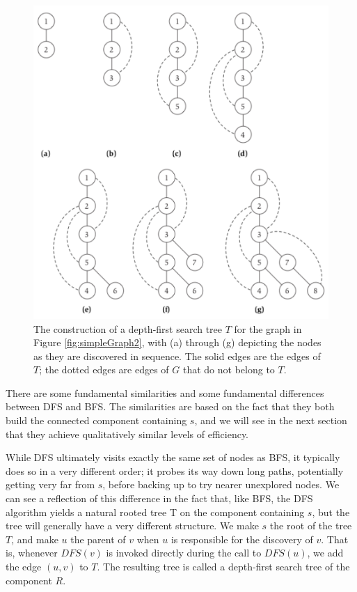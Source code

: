 \documentclass[12pt,a4paper]{book}
\begin{document}
\begin{figure}[h]
    \centering
    \label{fig:simpleGraph7}
    \includegraphics[width=\textwidth]{simpleGraph7}
    \caption{ The construction of a depth-first search tree $T$ for the graph in Figure \ref{fig:simpleGraph2}, with (a) through (g) depicting the nodes as they are discovered in sequence. The solid edges are the edges of $T$; the dotted edges are edges of $G$ that do not belong to $T$.}
\end{figure}
There are some fundamental similarities and some fundamental differences between DFS and BFS. The similarities are based on the fact that they both build the connected component containing $s$, and we will see in the next section that they achieve qualitatively similar levels of efficiency.\par
While DFS ultimately visits exactly the same set of nodes as BFS, it typically does so in a very different order; it probes its way down long paths, potentially getting very far from $s$, before backing up to try nearer unexplored nodes. We can see a reflection of this difference in the fact that, like BFS, the DFS algorithm yields a natural rooted tree T on the component containing $s$, but the tree will generally have a very different structure. We make $s$ the root of the tree $T$, and make $u$ the parent of $v$ when $u$ is responsible for the discovery of $v$. That is, whenever $DFS(v)$ is invoked directly during the call to $DFS(u)$, we add the edge $(u, v)$ to $T$. The resulting tree is called a depth-first search tree of the component $R$.\par
\end{document}
